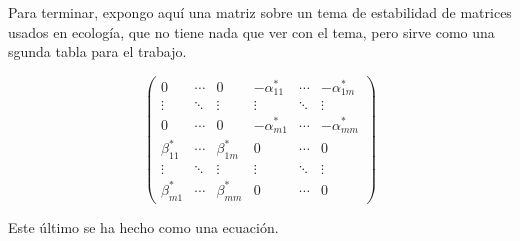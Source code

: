 \documentclass[11pt,a4paper]{article}
\begin{document}
Para terminar, expongo aquí una matriz sobre un tema de estabilidad de matrices usados en ecología, que no tiene nada que ver con el tema, pero sirve como una sgunda tabla para el trabajo.

\begin{equation}
  \left(
  \begin{array}{cccccc}
    0 & \cdots & 0 & -\alpha_{11}^* & \cdots & -\alpha_{1m}^* \\
    \vdots & \ddots & \vdots & \vdots & \ddots & \vdots \\
    0 & \cdots & 0 & -\alpha_{m1}^* & \cdots & -\alpha_{mm}^* \\
    \beta_{11}^* & \cdots & \beta_{1m}^* & 0 & \cdots & 0 \\
    \vdots & \ddots & \vdots & \vdots & \ddots & \vdots \\
    \beta_{m1}^* & \cdots & \beta_{mm}^* & 0 & \cdots & 0 
  \end{array}
  \right)
\end{equation}

Este último se ha hecho como una ecuación.






\nocite{Smith}
\nocite{Galindo}
\nocite{Sakurai}
\nocite{Laser}
\nocite{Ashcroft}
\nocite{Caos}
\nocite{Yo}
\end{document}

